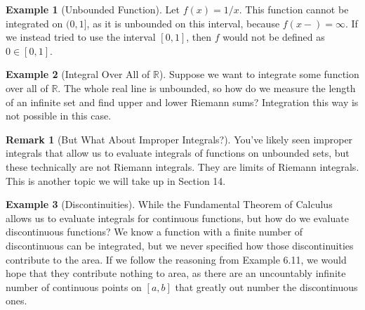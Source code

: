 \documentclass{article}
\newcommand{\R}{\mathbb{R}}
\theoremstyle{definition}
\newtheorem{example}{Example}[section]
\newtheorem{remark}{Remark}[section]
\begin{document}
	\begin{example}[Unbounded Function]
		Let $ f(x)=1/x $. This function cannot be integrated on $ (0,1] $, as it is unbounded on this interval, because $ f(x-)=\infty $. If we instead tried to use the interval $ [0,1] $, then $ f $ would not be defined as $ 0\in[0,1] $.  
	\end{example}
	\begin{example}[Integral Over All of $ \R $]
		Suppose we want to integrate some function over all of $ \R $. The whole real line is unbounded, so how do we measure the length of an infinite set and find upper and lower Riemann sums? Integration this way is not possible in this case. 
	\end{example}
	\begin{remark}[But What About Improper Integrals?]
		You've likely seen improper integrals that allow us to evaluate integrals of functions on unbounded sets, but these technically are not Riemann integrals. They are limits of Riemann integrals. This is another topic we will take up in Section 14. 
	\end{remark}
	\begin{example}[Discontinuities]
		While the Fundamental Theorem of Calculus allows us to evaluate integrals for continuous functions, but how do we evaluate discontinuous functions? We know a function with a finite number of discontinuous can be integrated, but we never specified how those discontinuities contribute to the area. If we follow the reasoning from Example 6.11, we would hope that they contribute nothing to area, as there are an uncountably infinite number of continuous points on $ [a,b] $ that greatly out number the discontinuous ones. 
	\end{example}
	
	
	\newpage
	
	
\end{document}
